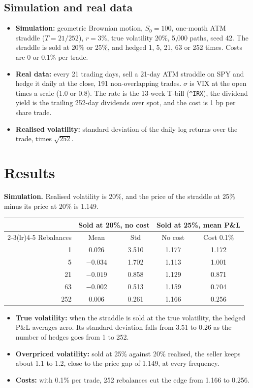 \documentclass[11pt,a4paper]{article}
\begin{document}
\subsection{Simulation and real data}
\begin{itemize}
\item \textbf{Simulation:} geometric Brownian motion, $S_0=100$, one-month ATM straddle ($T=21/252$), $r=3\%$, true volatility 20\%, 5,000 paths, seed 42. The straddle is sold at 20\% or 25\%, and hedged 1, 5, 21, 63 or 252 times. Costs are 0 or 0.1\% per trade.
\item \textbf{Real data:} every 21 trading days, sell a 21-day ATM straddle on SPY and hedge it daily at the close, 191 non-overlapping trades. $\sigma$ is VIX at the open times a scale (1.0 or 0.8). The rate is the 13-week T-bill (\verb|^IRX|), the dividend yield is the trailing 252-day dividends over spot, and the cost is 1 bp per share trade.
\item \textbf{Realised volatility:} standard deviation of the daily log returns over the trade, times $\sqrt{252}$.
\end{itemize}

\section{Results}
\textbf{Simulation.} Realised volatility is 20\%, and the price of the straddle at 25\% minus its price at 20\% is 1.149.

\begin{center}
\begin{tabular}{@{}rcccc@{}}
\toprule
 & \multicolumn{2}{c}{Sold at 20\%, no cost} & \multicolumn{2}{c}{Sold at 25\%, mean P\&L} \\
\cmidrule(lr){2-3}\cmidrule(lr){4-5}
Rebalances & Mean & Std & No cost & Cost 0.1\% \\
\midrule
1 & 0.026 & 3.510 & 1.177 & 1.172 \\
5 & $-0.034$ & 1.702 & 1.113 & 1.001 \\
21 & $-0.019$ & 0.858 & 1.129 & 0.871 \\
63 & $-0.002$ & 0.513 & 1.159 & 0.704 \\
252 & 0.006 & 0.261 & 1.166 & 0.256 \\
\bottomrule
\end{tabular}
\end{center}

\begin{itemize}
\item \textbf{True volatility:} when the straddle is sold at the true volatility, the hedged P\&L averages zero. Its standard deviation falls from 3.51 to 0.26 as the number of hedges goes from 1 to 252.
\item \textbf{Overpriced volatility:} sold at 25\% against 20\% realised, the seller keeps about 1.1 to 1.2, close to the price gap of 1.149, at every frequency.
\item \textbf{Costs:} with 0.1\% per trade, 252 rebalances cut the edge from 1.166 to 0.256.
\end{itemize}
\end{document}
